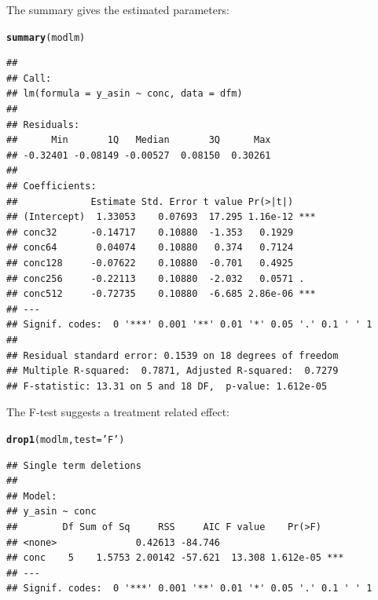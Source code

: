 \documentclass{scrartcl}\usepackage[]{graphicx}\usepackage[]{color}
\makeatletter
\newcommand{\hlstr}[1]{\textcolor[rgb]{0.192,0.494,0.8}{#1}}%
\newcommand{\hlstd}[1]{\textcolor[rgb]{0.345,0.345,0.345}{#1}}%
\newcommand{\hlkwc}[1]{\textcolor[rgb]{0.333,0.667,0.333}{#1}}%
\newcommand{\hlkwd}[1]{\textcolor[rgb]{0.737,0.353,0.396}{\textbf{#1}}}%
\newenvironment{kframe}{%
 \def\at@end@of@kframe{}%
 \ifinner\ifhmode%
  \def\at@end@of@kframe{\end{minipage}}%
  \begin{minipage}{\columnwidth}%
 \fi\fi%
 \def\FrameCommand##1{\hskip\@totalleftmargin \hskip-\fboxsep
 \colorbox{shadecolor}{##1}\hskip-\fboxsep
     \hskip-\linewidth \hskip-\@totalleftmargin \hskip\columnwidth}%
 \MakeFramed {\advance\hsize-\width
   \@totalleftmargin\z@ \linewidth\hsize
   \@setminipage}}%
 {\par\unskip\endMakeFramed%
 \at@end@of@kframe}
\newenvironment{knitrout}{}{} %
\makeatother
\begin{document}
The summary gives the estimated parameters:
\begin{knitrout}
\color{fgcolor}\begin{kframe}
\begin{alltt}
\hlkwd{summary}\hlstd{(modlm)}
\end{alltt}
\begin{verbatim}
## 
## Call:
## lm(formula = y_asin ~ conc, data = dfm)
## 
## Residuals:
##      Min       1Q   Median       3Q      Max 
## -0.32401 -0.08149 -0.00527  0.08150  0.30261 
## 
## Coefficients:
##             Estimate Std. Error t value Pr(>|t|)    
## (Intercept)  1.33053    0.07693  17.295 1.16e-12 ***
## conc32      -0.14717    0.10880  -1.353   0.1929    
## conc64       0.04074    0.10880   0.374   0.7124    
## conc128     -0.07622    0.10880  -0.701   0.4925    
## conc256     -0.22113    0.10880  -2.032   0.0571 .  
## conc512     -0.72735    0.10880  -6.685 2.86e-06 ***
## ---
## Signif. codes:  0 '***' 0.001 '**' 0.01 '*' 0.05 '.' 0.1 ' ' 1
## 
## Residual standard error: 0.1539 on 18 degrees of freedom
## Multiple R-squared:  0.7871,	Adjusted R-squared:  0.7279 
## F-statistic: 13.31 on 5 and 18 DF,  p-value: 1.612e-05
\end{verbatim}
\end{kframe}
\end{knitrout}

The F-test suggests a treatment related effect:
\begin{knitrout}
\color{fgcolor}\begin{kframe}
\begin{alltt}
\hlkwd{drop1}\hlstd{(modlm,} \hlkwc{test} \hlstd{=} \hlstr{'F'}\hlstd{)}
\end{alltt}
\begin{verbatim}
## Single term deletions
## 
## Model:
## y_asin ~ conc
##        Df Sum of Sq     RSS     AIC F value    Pr(>F)    
## <none>              0.42613 -84.746                      
## conc    5    1.5753 2.00142 -57.621  13.308 1.612e-05 ***
## ---
## Signif. codes:  0 '***' 0.001 '**' 0.01 '*' 0.05 '.' 0.1 ' ' 1
\end{verbatim}
\end{kframe}
\end{knitrout}
\end{document}
